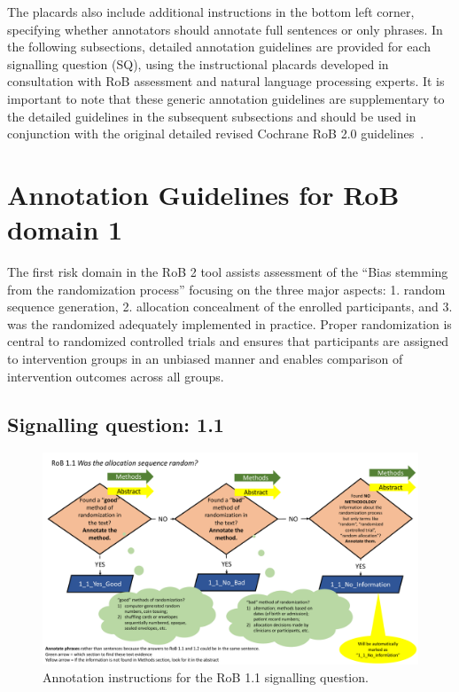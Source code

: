 \documentclass[sn-mathphys,Numbered]{sn-jnl}%
\begin{document}
%
%
%
The placards also include additional instructions in the bottom left corner, specifying whether annotators should annotate full sentences or only phrases.
In the following subsections, detailed annotation guidelines are provided for each signalling question (SQ), using the instructional placards developed in consultation with RoB assessment and natural language processing experts.
It is important to note that these generic annotation guidelines are supplementary to the detailed guidelines in the subsequent subsections and should be used in conjunction with the original detailed revised Cochrane RoB 2.0 guidelines~\cite{sterne2019rob}.
%
%
%
\section*{Annotation Guidelines for RoB domain 1}
\label{sec:dom1}
%
The first risk domain in the RoB 2 tool assists assessment of the ``Bias stemming from the randomization process'' focusing on the three major aspects: 1. random sequence generation, 2. allocation concealment of the enrolled participants, and 3. was the randomized adequately implemented in practice.
Proper randomization is central to randomized controlled trials and ensures that participants are assigned to intervention groups in an unbiased manner and enables comparison of intervention outcomes across all groups.
%
%
%
\subsection*{Signalling question: 1.1}
\label{subsec:1_1}
%
\begin{figure}[hbt]
    \centering
    \includegraphics[width=\textwidth]{figures/1_1.pdf}
    \caption{Annotation instructions for the RoB 1.1 signalling question.}
    \label{fig:1_1}
\end{figure}
%
%
%
\end{document}
